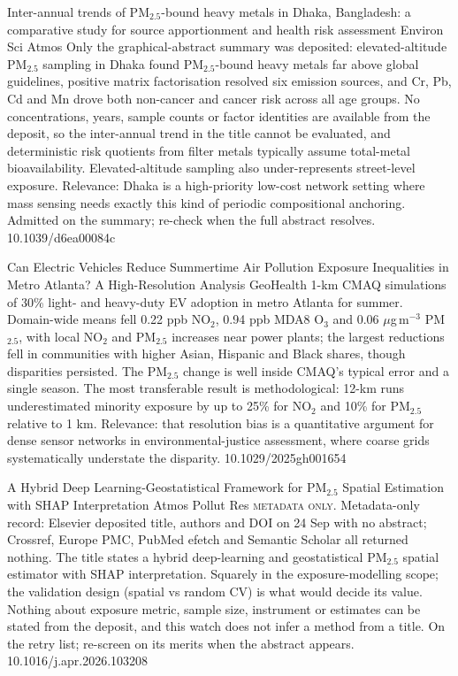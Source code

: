 \documentclass[10pt]{article}
\begin{document}
{Inter-annual trends of PM$_{2.5}$-bound heavy metals in Dhaka, Bangladesh: a comparative study for source apportionment and health risk assessment}
{Environ Sci Atmos}
{Only the graphical-abstract summary was deposited: elevated-altitude PM$_{2.5}$ sampling in Dhaka found PM$_{2.5}$-bound heavy metals far above global guidelines, positive matrix factorisation resolved six emission sources, and Cr, Pb, Cd and Mn drove both non-cancer and cancer risk across all age groups. No concentrations, years, sample counts or factor identities are available from the deposit, so the inter-annual trend in the title cannot be evaluated, and deterministic risk quotients from filter metals typically assume total-metal bioavailability. Elevated-altitude sampling also under-represents street-level exposure. Relevance: Dhaka is a high-priority low-cost network setting where mass sensing needs exactly this kind of periodic compositional anchoring. Admitted on the summary; re-check when the full abstract resolves.}
{10.1039/d6ea00084c}

{Can Electric Vehicles Reduce Summertime Air Pollution Exposure Inequalities in Metro Atlanta? A High-Resolution Analysis}
{GeoHealth}
{1-km CMAQ simulations of 30\% light- and heavy-duty EV adoption in metro Atlanta for summer. Domain-wide means fell 0.22 ppb NO$_2$, 0.94 ppb MDA8 O$_3$ and 0.06 $\mu$g\,m$^{-3}$ PM$_{2.5}$, with local NO$_2$ and PM$_{2.5}$ increases near power plants; the largest reductions fell in communities with higher Asian, Hispanic and Black shares, though disparities persisted. The PM$_{2.5}$ change is well inside CMAQ's typical error and a single season. The most transferable result is methodological: 12-km runs underestimated minority exposure by up to 25\% for NO$_2$ and 10\% for PM$_{2.5}$ relative to 1 km. Relevance: that resolution bias is a quantitative argument for dense sensor networks in environmental-justice assessment, where coarse grids systematically understate the disparity.}
{10.1029/2025gh001654}

{A Hybrid Deep Learning-Geostatistical Framework for PM$_{2.5}$ Spatial Estimation with SHAP Interpretation}
{Atmos Pollut Res}
{\textsc{metadata only.} Metadata-only record: Elsevier deposited title, authors and DOI on 24 Sep with no abstract; Crossref, Europe PMC, PubMed efetch and Semantic Scholar all returned nothing. The title states a hybrid deep-learning and geostatistical PM$_{2.5}$ spatial estimator with SHAP interpretation. Squarely in the exposure-modelling scope; the validation design (spatial vs random CV) is what would decide its value. Nothing about exposure metric, sample size, instrument or estimates can be stated from the deposit, and this watch does not infer a method from a title. On the retry list; re-screen on its merits when the abstract appears.}
{10.1016/j.apr.2026.103208}
\end{document}
